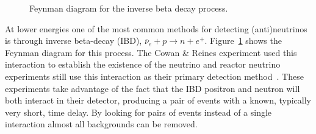 \begin{figure}[htbp]
\centering
\begin{feynman}
\end{feynman}
\caption[Inverse Beta Decay Feynman Diagram]{Feynman diagram for the 
inverse beta decay process.}
\label{fig:ibd}
\end{figure}
At lower energies one of the most common methods for detecting (anti)neutrinos
is through inverse beta-decay (IBD), $\overline{\nu}_{e} + p \rightarrow n + e^{+}$.
Figure~\ref{fig:ibd} shows the Feynman diagram for this process.
The Cowan \& Reines experiment used this interaction to establish the existence
of the neutrino and reactor neutrino experiments still use this interaction as
their primary detection method~\cite{double_chooz1, daya_bay, reno}.
These experiments take advantage of the fact that the IBD positron and neutron
will both interact in their detector, producing a pair
of events with a known, typically very short, time delay.
By looking for pairs of events instead of a single interaction almost
all backgrounds can be removed.

\begin{figure}[htbp]
\centering
\begin{subfigure}[b]{0.48\textwidth}
\begin{feynman}
\end{feynman}
\caption[]{}
\label{fig:nuclear_cc}
\end{subfigure}
\hfill
\begin{subfigure}[b]{0.48\textwidth}
\begin{feynman}
\end{feynman}
\caption[]{}
\label{fig:nuclear_nc}
\end{subfigure}
\caption[Neutrino Nuclear Interactions]{}
\label{fig:nuclear_interactions}
\end{figure}

